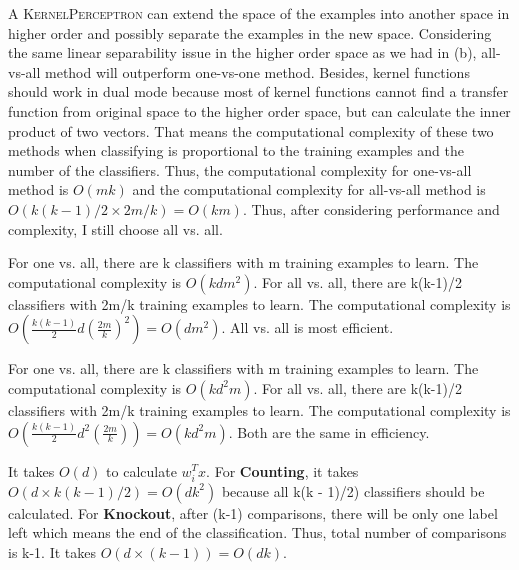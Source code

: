\item[(c)]
A \textsc{KernelPerceptron} can extend the space of the examples into another space in higher order and possibly separate the examples in the new space. Considering the same linear separability issue in the higher order space as we had in (b), all-vs-all method will outperform one-vs-one method. Besides, kernel functions should work in dual mode because most of kernel functions cannot find a transfer function from original space to the higher order space, but can calculate the inner product of two vectors. That means the computational complexity of these two methods when classifying is proportional to the training examples and the number of the classifiers. Thus, the computational complexity for one-vs-all method is $O(mk)$ and the computational complexity for all-vs-all method is $O(k(k-1)/2\times 2m/k)=O(km)$. Thus, after considering performance and complexity, I still choose all vs. all.

\item[(d)]
For one vs. all, there are k classifiers with m training examples to learn. The computational complexity is $O(kdm^2)$.
For all vs. all, there are k(k-1)/2 classifiers with 2m/k training examples to learn. The computational complexity is 
$O(\frac{k(k-1)}{2}d(\frac{2m}{k})^2) = O(dm^2)$. All vs. all is most efficient.

\item[(e)]
For one vs. all, there are k classifiers with m training examples to learn. The computational complexity is $O(kd^2m)$.
For all vs. all, there are k(k-1)/2 classifiers with 2m/k training examples to learn. The computational complexity is 
$O(\frac{k(k-1)}{2}d^2(\frac{2m}{k})) = O(kd^2m)$. Both are the same in efficiency.

\item[(f)]
It takes $O(d)$ to calculate $w^T_ix$. For \textbf{Counting}, it takes $O(d\times k(k - 1)/2)= O(dk^2)$ because all k(k - 1)/2) classifiers should be calculated.
For \textbf{Knockout}, after (k-1) comparisons, there will be only one label left which means the end of the classification. Thus, total number of comparisons is k-1. It takes $O(d\times (k-1))=O(dk)$.  





